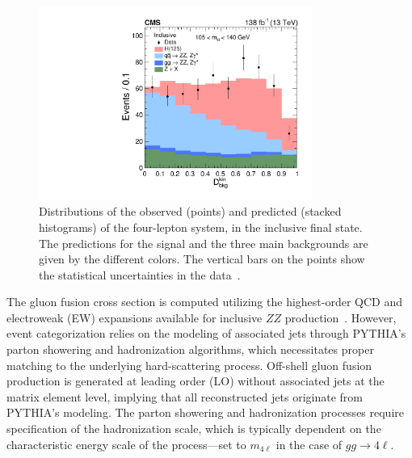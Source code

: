 
\begin{figure}[!hbt]
\centering
\includegraphics[width=0.8\textwidth,clip] {figures/Figure_004.pdf}
\caption{Distributions of the observed (points) and predicted (stacked histograms) \Dbkgkin of the four-lepton system, in the inclusive final state. The predictions for the \Hboson signal and the three main backgrounds are given by the different colors.  The vertical bars on the points show the statistical uncertainties in the data~\cite{PhysRevD.111.092014}.}
\label{fig:DiscDist}
\end{figure}


The gluon fusion cross section is computed utilizing the highest-order QCD and electroweak (EW) expansions available for inclusive $ZZ$ production~\cite{deFlorian:2016spz}. 
However, event categorization relies on the modeling of associated jets through PYTHIA's parton showering and hadronization algorithms, which necessitates proper matching to the underlying hard-scattering process. Off-shell gluon fusion production is generated at leading order (LO) without associated jets at the matrix element level, implying that all reconstructed jets originate from PYTHIA's modeling. 
The parton showering and hadronization processes require specification of the hadronization scale, which is typically dependent on the characteristic energy scale of the process—set to $m_{4\ell}$ in the case of $gg\to 4\ell$.

